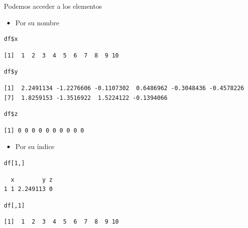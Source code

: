 \documentclass[xcolor={usenames,svgnames,dvipsnames}]{beamer}
\begin{document}
\begin{frame}[fragile,label=sec-3-2-2]{Podemos acceder a los elementos}
 \begin{itemize}
\item Por su nombre
\end{itemize}
\lstset{language=R,label= ,caption= ,numbers=none}
\begin{lstlisting}
df$x
\end{lstlisting}

\begin{verbatim}
[1]  1  2  3  4  5  6  7  8  9 10
\end{verbatim}

\lstset{language=R,label= ,caption= ,numbers=none}
\begin{lstlisting}
df$y
\end{lstlisting}

\begin{verbatim}
[1]  2.2491134 -1.2276606 -0.1107302  0.6486962 -0.3048436 -0.4578226
[7]  1.8259153 -1.3516922  1.5224122 -0.1394066
\end{verbatim}

\lstset{language=R,label= ,caption= ,numbers=none}
\begin{lstlisting}
df$z
\end{lstlisting}

\begin{verbatim}
[1] 0 0 0 0 0 0 0 0 0 0
\end{verbatim}

\begin{itemize}
\item Por su índice
\end{itemize}
\lstset{language=R,label= ,caption= ,numbers=none}
\begin{lstlisting}
df[1,]
\end{lstlisting}

\begin{verbatim}
  x        y z
1 1 2.249113 0
\end{verbatim}

\lstset{language=R,label= ,caption= ,numbers=none}
\begin{lstlisting}
df[,1]
\end{lstlisting}

\begin{verbatim}
[1]  1  2  3  4  5  6  7  8  9 10
\end{verbatim}
\end{frame}
\end{document}
